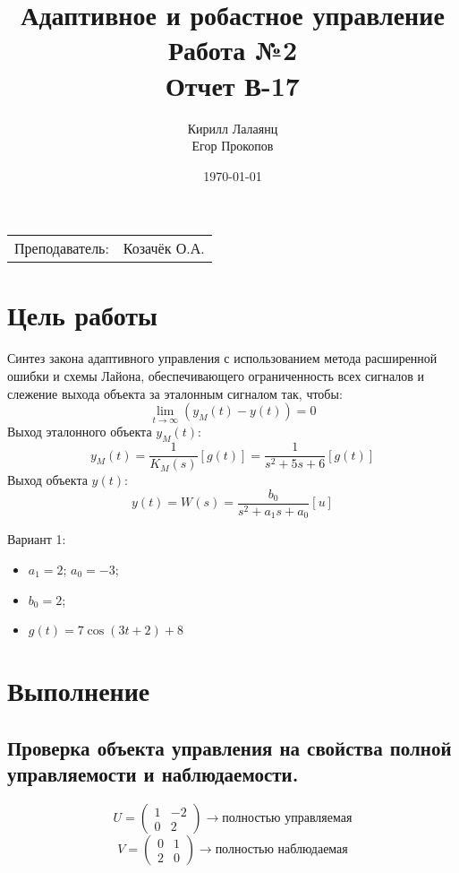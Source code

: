 \documentclass{article}
\title{Адаптивное и робастное управление \\ Работа №2 \\ Отчет В-17} %
\author{Кирилл Лалаянц \\ Егор Прокопов} %
\date{\today} %
\begin{document}
\maketitle %

\begin{center}
\begin{tabular}{l r}
Преподаватель: & Козачёк О.А. %
\end{tabular}
\end{center}
\newpage

\section{Цель работы}

Синтез закона адаптивного управления с использованием метода расширенной ошибки и схемы Лайона, обеспечивающего
ограниченность всех сигналов и слежение выхода объекта за эталонным
сигналом так, чтобы:
\[\lim_{t \rightarrow \infty}(y_M(t) - y(t)) = 0\]
Выход эталонного объекта \(y_M(t)\):
\[y_M(t) = \frac{1}{K_M(s)}[g(t)]=  \frac{1}{s^2 + 5s + 6}[g(t)]\]
Выход объекта \(y(t)\):
\[y(t) = W(s) = \frac{b_0}{s^2 + a_1 s + a_0}[u]\]

Вариант 1: 
\begin{itemize}
  \item \(a_1 = 2\); \(a_0 = -3\);
  \item \(b_0 = 2\);
  \item \(g(t) = 7 \cos(3t + 2) + 8\)
\end{itemize}


\section{Выполнение}
\subsection{Проверка объекта управления на свойства полной управляемости и наблюдаемости.}
\[U = \begin{pmatrix}
  1 & -2 \\
  0 & 2
\end{pmatrix} \rightarrow \text{полностью управляемая}\]
\[V = \begin{pmatrix}
  0 & 1 \\
  2 & 0
\end{pmatrix} \rightarrow \text{полностью наблюдаемая}\]
\end{document}
